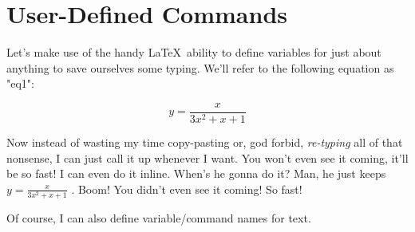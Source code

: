 \documentclass{article}
\begin{document}
\section{User-Defined Commands}
Let's make use of the handy \LaTeX \ ability to define variables for just about anything to save ourselves some typing.  We'll refer to the following equation as "eq1":

\def\eq1{y = \frac{x}{3x^2 + x + 1}} %

$$\eq1$$

Now instead of wasting my time copy-pasting or, god forbid, \textit{re-typing} all of that nonsense, I can just call it up whenever I want.  You won't even see it coming, it'll be so fast!  I can even do it inline.  When's he gonna do it?  Man, he just keeps $\eq1$ . Boom!  You didn't even see it coming!  So fast!

\def\likeaboss{I can also define variable/command names for text.}

Of course, \likeaboss
\end{document}
